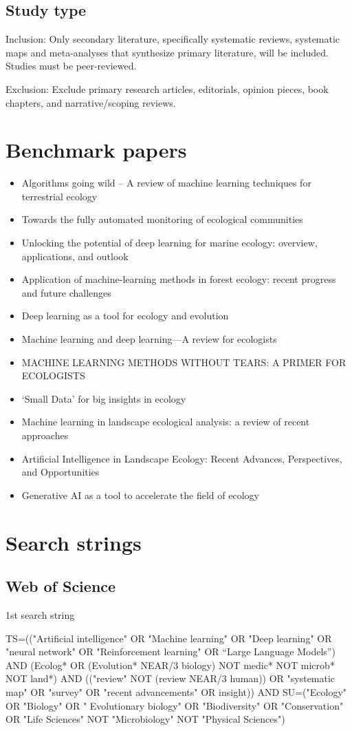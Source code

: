 \documentclass{article}
\newcommand{\bei}{\begin{itemize}}
\newcommand{\eei}{\end{itemize}}
\begin{document}
\subsection{Study type}
Inclusion: Only secondary literature, specifically systematic reviews, systematic maps and meta-analyses that synthesize primary literature, will be included. Studies must be peer-reviewed.

Exclusion: Exclude primary research articles, editorials, opinion pieces, book chapters, and narrative/scoping reviews.

\section{Benchmark papers}
\bei
\item Algorithms going wild – A review of machine learning techniques for terrestrial ecology
\item Towards the fully automated monitoring of ecological communities
\item Unlocking the potential of deep learning for marine ecology: overview, applications, and outlook
\item Application of machine-learning methods in forest ecology: recent progress and future challenges
\item Deep learning as a tool for ecology and evolution
\item Machine learning and deep learning—A review for ecologists
\item MACHINE LEARNING METHODS WITHOUT TEARS: A PRIMER FOR ECOLOGISTS
\item ‘Small Data’ for big insights in ecology
\item Machine learning in landscape ecological analysis: a review of recent approaches
\item Artificial Intelligence in Landscape Ecology: Recent Advances, Perspectives, and Opportunities
\item Generative AI as a tool to accelerate the field of ecology
\eei

\section{Search strings}
\subsection{Web of Science}
1st search string

TS=(("Artificial intelligence" OR "Machine learning" OR "Deep learning" OR "neural network" OR "Reinforcement learning" OR “Large Language Models”) AND (Ecolog* OR (Evolution* NEAR/3 biology) NOT medic* NOT microb* NOT land*) AND (("review" NOT (review NEAR/3 human)) OR "systematic map" OR "survey" OR "recent advancements" OR insight)) AND SU=("Ecology" OR "Biology" OR " Evolutionary biology" OR "Biodiversity" OR "Conservation" OR "Life Sciences" NOT "Microbiology" NOT "Physical Sciences")
\end{document}
